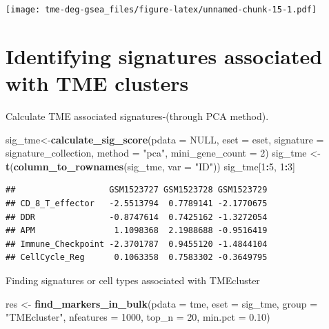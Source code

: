 \documentclass[
  12pt,
]{book}
\newenvironment{Shaded}{\begin{snugshade}}{\end{snugshade}}
\newcommand{\AttributeTok}[1]{\textcolor[rgb]{0.13,0.29,0.53}{#1}}
\newcommand{\ConstantTok}[1]{\textcolor[rgb]{0.56,0.35,0.01}{#1}}
\newcommand{\DecValTok}[1]{\textcolor[rgb]{0.00,0.00,0.81}{#1}}
\newcommand{\FloatTok}[1]{\textcolor[rgb]{0.00,0.00,0.81}{#1}}
\newcommand{\FunctionTok}[1]{\textcolor[rgb]{0.13,0.29,0.53}{\textbf{#1}}}
\newcommand{\NormalTok}[1]{#1}
\newcommand{\OtherTok}[1]{\textcolor[rgb]{0.56,0.35,0.01}{#1}}
\newcommand{\SpecialCharTok}[1]{\textcolor[rgb]{0.81,0.36,0.00}{\textbf{#1}}}
\newcommand{\StringTok}[1]{\textcolor[rgb]{0.31,0.60,0.02}{#1}}
\begin{document}
\texttt{[image: tme-deg-gsea\_files/figure-latex/unnamed-chunk-15-1.pdf]}

\hypertarget{identifying-signatures-associated-with-tme-clusters-1}{%
\section{Identifying signatures associated with TME clusters}\label{identifying-signatures-associated-with-tme-clusters-1}}

Calculate TME associated signatures-(through PCA method).

\begin{Shaded}
\begin{Highlighting}[]
\NormalTok{sig\_tme}\OtherTok{\textless{}{-}}\FunctionTok{calculate\_sig\_score}\NormalTok{(}\AttributeTok{pdata           =} \ConstantTok{NULL}\NormalTok{,}
                             \AttributeTok{eset            =}\NormalTok{ eset,}
                             \AttributeTok{signature       =}\NormalTok{ signature\_collection,}
                             \AttributeTok{method          =} \StringTok{"pca"}\NormalTok{,}
                             \AttributeTok{mini\_gene\_count =} \DecValTok{2}\NormalTok{)}
\NormalTok{sig\_tme }\OtherTok{\textless{}{-}} \FunctionTok{t}\NormalTok{(}\FunctionTok{column\_to\_rownames}\NormalTok{(sig\_tme, }\AttributeTok{var =} \StringTok{"ID"}\NormalTok{))}
\NormalTok{sig\_tme[}\DecValTok{1}\SpecialCharTok{:}\DecValTok{5}\NormalTok{, }\DecValTok{1}\SpecialCharTok{:}\DecValTok{3}\NormalTok{]}
\end{Highlighting}
\end{Shaded}

\begin{verbatim}
##                   GSM1523727 GSM1523728 GSM1523729
## CD_8_T_effector   -2.5513794  0.7789141 -2.1770675
## DDR               -0.8747614  0.7425162 -1.3272054
## APM                1.1098368  2.1988688 -0.9516419
## Immune_Checkpoint -2.3701787  0.9455120 -1.4844104
## CellCycle_Reg      0.1063358  0.7583302 -0.3649795
\end{verbatim}

Finding signatures or cell types associated with TMEcluster

\begin{Shaded}
\begin{Highlighting}[]
\NormalTok{res }\OtherTok{\textless{}{-}} \FunctionTok{find\_markers\_in\_bulk}\NormalTok{(}\AttributeTok{pdata =}\NormalTok{ tme, }\AttributeTok{eset =}\NormalTok{ sig\_tme, }\AttributeTok{group =} \StringTok{"TMEcluster"}\NormalTok{, }\AttributeTok{nfeatures =} \DecValTok{1000}\NormalTok{, }\AttributeTok{top\_n =} \DecValTok{20}\NormalTok{, }\AttributeTok{min.pct =} \FloatTok{0.10}\NormalTok{)}
\end{Highlighting}
\end{Shaded}
\end{document}

